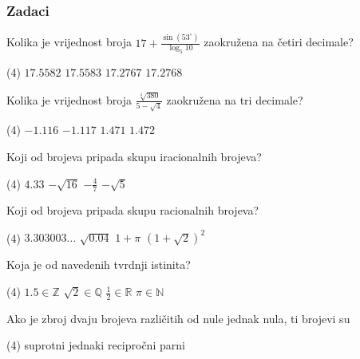 \newpage

\subsubsection{Zadaci}

\begin{zadatak}
    Kolika je vrijednost broja $\displaystyle 17 + \frac{\sin (53^{\circ})}{\log_5 10}$ zaokružena na četiri decimale?
    \begin{tasks}(4)
		\task $17.5582$
		\task $17.5583$
		\task $17.2767$
		\task $17.2768$
	\end{tasks}
\end{zadatak}

\begin{zadatak}
    Kolika je vrijednost broja $\displaystyle \frac{\sqrt[4]{380}}{5-\sqrt {4}}$ zaokružena na tri decimale?
    \begin{tasks}(4)
		\task $-1.116$
		\task $-1.117$
		\task $1.471$
		\task $1.472$
	\end{tasks}
\end{zadatak}

\begin{zadatak}
    Koji od brojeva pripada skupu iracionalnih brojeva?
    \begin{tasks}(4)
		\task $4.33$
		\task $-\sqrt{16}$
		\task $-\displaystyle\frac{4}{7}$
		\task $-\sqrt{5}$
	\end{tasks}
\end{zadatak}

\begin{zadatak}
	Koji od brojeva pripada skupu racionalnih brojeva?
    \begin{tasks}(4)
		\task $3.303003\ldots$
		\task $\sqrt{0.04}$
		\task $1+\pi$
		\task $(1+\sqrt{2})^2$
	\end{tasks}
\end{zadatak}

\begin{zadatak}
	Koja je od navedenih tvrdnji istinita?
    \begin{tasks}(4)
		\task $1.5 \in \mathbb{Z}$
		\task $\sqrt{2} \in \mathbb{Q}$
		\task $\displaystyle \frac{1}{2} \in \mathbb{R}$
		\task $\pi \in \mathbb{N}$
	\end{tasks}
\end{zadatak}

\begin{zadatak}
	Ako je zbroj dvaju brojeva različitih od nule jednak nula, ti brojevi su
    \begin{tasks}(4)
		\task suprotni
		\task jednaki
		\task recipročni
		\task parni
	\end{tasks}
\end{zadatak}

